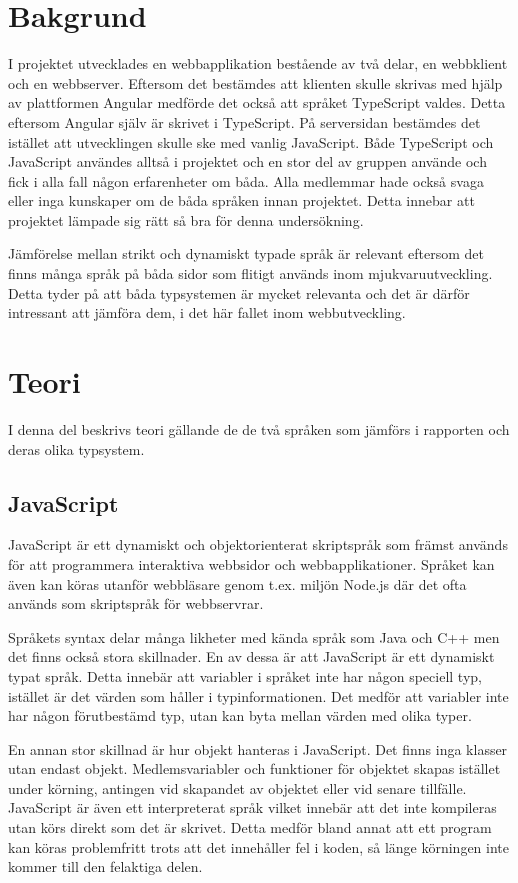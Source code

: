 \section{Bakgrund}
I projektet utvecklades en webbapplikation bestående av två delar, en webbklient och en webbserver. Eftersom det bestämdes att klienten skulle skrivas med hjälp av plattformen Angular medförde det också att språket TypeScript valdes. Detta eftersom Angular själv är skrivet i TypeScript. På serversidan bestämdes det istället att utvecklingen skulle ske med vanlig JavaScript. Både TypeScript och JavaScript användes alltså i projektet och en stor del av gruppen använde och fick i alla fall någon erfarenheter om båda. Alla medlemmar hade också svaga eller inga kunskaper om de båda språken innan projektet. Detta innebar att projektet lämpade sig rätt så bra för denna undersökning.

Jämförelse mellan strikt och dynamiskt typade språk är relevant eftersom det finns många språk på båda sidor som flitigt används inom mjukvaruutveckling. Detta tyder på att båda typsystemen är mycket relevanta och det är därför intressant att jämföra dem, i det här fallet inom webbutveckling.
\section{Teori}
I denna del beskrivs teori gällande de de två språken som jämförs i rapporten och deras olika typsystem.
\subsection{JavaScript}
JavaScript är ett dynamiskt och objektorienterat skriptspråk som främst används för att programmera interaktiva webbsidor och webbapplikationer. Språket kan även kan köras utanför webbläsare genom t.ex. miljön Node.js där det ofta används som skriptspråk för webbservrar. \cite{henrik_js1}

Språkets syntax delar många likheter med kända språk som Java och C++ men det finns också stora skillnader. En av dessa är att JavaScript är ett dynamiskt typat språk. Detta innebär att variabler i språket inte har någon speciell typ, istället är det värden som håller i typinformationen. Det medför att variabler inte har någon förutbestämd typ, utan kan byta mellan värden med olika typer. \cite{henrik_js2}

En annan stor skillnad är hur objekt hanteras i JavaScript. Det finns inga klasser utan endast objekt. Medlemsvariabler och funktioner för objektet skapas istället under körning, antingen vid skapandet av objektet eller vid senare tillfälle. \cite{henrik_js3}
JavaScript är även ett interpreterat språk \cite{henrik_js1} vilket innebär att det inte kompileras utan körs direkt som det är skrivet. Detta medför bland annat att ett program kan köras problemfritt trots att det innehåller fel i koden, så länge körningen inte kommer till den felaktiga delen.
